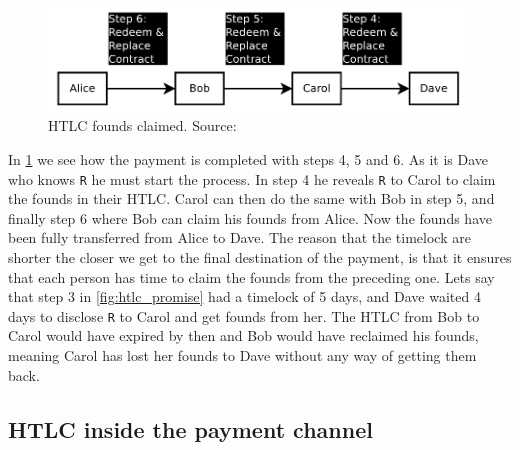 \begin{figure}[ht]
    \centering
    \includegraphics[width=11cm]{figures/htlc_settle.png}
    \caption{HTLC founds claimed. Source: \cite{poon2015bitcoin}}
    \label{fig:htlc_settle}
\end{figure}

In \cref{fig:htlc_settle} we see how the payment is completed with steps 4, 5 and 6. As it is Dave who knows {\tt R} he must start the process. In step 4 he reveals {\tt R} to Carol to claim the founds in their HTLC. Carol can then do the same with Bob in step 5, and finally step 6 where Bob can claim his founds from Alice.
Now the founds have been fully transferred from Alice to Dave.
The reason that the timelock are shorter the closer we get to the final destination of the payment, is that it ensures that each person has time to claim the founds from the preceding one. Lets say that step 3 in \cref{fig:htlc_promise} had a timelock of 5 days, and Dave waited 4 days to disclose {\tt R} to Carol and get founds from her. The HTLC from Bob to Carol would have expired by then and Bob would have reclaimed his founds, meaning Carol has lost her founds to Dave without any way of getting them back.



\subsection{HTLC inside the payment channel}
\label{subsec:htlcln}

